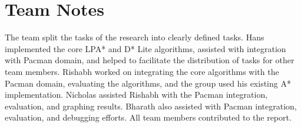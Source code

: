 \section{Team Notes}
The team split the tasks of the research into clearly defined tasks. Hans implemented the core LPA* and D* Lite algorithms, assisted with integration with Pacman domain, and helped to facilitate the distribution of tasks for other team members. Rishabh worked on integrating the core algorithms with the Pacman domain, evaluating the algorithms, and the group used his existing A* implementation. Nicholas assisted Rishabh with the Pacman integration, evaluation, and graphing results. Bharath also assisted with Pacman integration, evaluation, and debugging efforts. All team members contributed to the report.